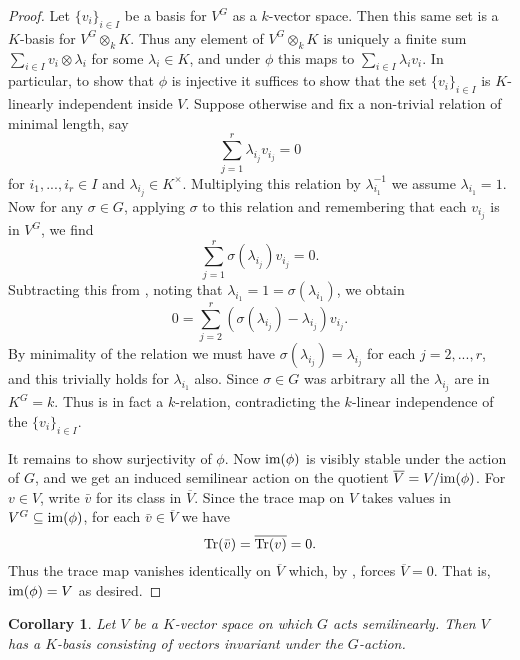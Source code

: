 \documentclass[11pt]{amsart}
\numberwithin{equation}{section}
\newtheorem{cor}[equation]{Corollary}
\theoremstyle{remark}
\theoremstyle{remark}
\theoremstyle{remark}
\theoremstyle{definition}
\theoremstyle{definition}
\theoremstyle{definition}
\theoremstyle{definition}
\theoremstyle{definition}
\theoremstyle{definition}
\begin{document}
\begin{proof}
 Let $\{v_i\}_{i\in I}$ be a basis for $V^G$ as a $k$-vector space. Then this same set is a $K$-basis for $V^G\otimes_k K$. Thus any element of $V^G\otimes_k K$ is uniquely a finite sum
$\sum_{i\in I}v_i\otimes \lambda_i$
for some $\lambda_i\in K$, and under $\phi$ this maps to $\sum_{i\in I}\lambda_i v_i$. In particular, to show that $\phi$ is injective it suffices to show that the set $\{v_i\}_{i\in I}$ is $K$-linearly independent inside $V$. Suppose otherwise and fix a non-trivial relation of minimal length, say
\begin{equation}\label{min relation}\sum_{j=1}^r\lambda_{i_j} v_{i_j}=0\end{equation}
for $i_1,...,i_r\in I$ and $\lambda_{i_j}\in K^\times$. Multiplying this relation by $\lambda_{i_1}^{-1}$ we  assume $\lambda_{i_1}=1$. Now for any $\sigma\in G$, applying $\sigma$ to this relation  and remembering that each $v_{i_j}$ is in $V^G$, we find
\[\sum_{j=1}^r\sigma(\lambda_{i_j})v_{i_j}=0.\]
Subtracting this from , noting that $\lambda_{i_1}=1=\sigma(\lambda_{i_1})$, we obtain 
\[0=\sum_{j=2}^{r}\left(\sigma(\lambda_{i_j})-\lambda_{i_j}\right)v_{i_j}.\]
By minimality of the relation  we must have $\sigma(\lambda_{i_j})=\lambda_{i_j}$ for each $j=2,...,r$, and this trivially holds for $\lambda_{i_1}$ also. Since $\sigma \in G$ was arbitrary all the $\lambda_{i_j}$ are in $K^G=k$. Thus  is in fact a $k$-relation, contradicting the $k$-linear independence of the $\{v_i\}_{i\in I}$. 

It remains to show surjectivity of $\phi$.  Now $\textup{im}(\phi)$ is visibly stable under the action of $G$, and we get an induced semilinear action on the quotient $\overline{V}=V/\textup{im}(\phi)$. For $v\in V$, write $\bar{v}$ for its class in $\overline{V}$. Since the trace map on $V$ takes values in $V^G\subseteq \textup{im}(\phi)$, for each $\bar{v}\in \overline{V}$ we have
\[\textup{Tr}(\bar{v})=\overline{\textup{Tr}(v)}=0.\]
Thus the trace map vanishes identically on $\overline{V}$ which, by , forces $\overline{V}=0$. That is, $\textup{im}(\phi)=V$ as desired.
\end{proof}

\begin{cor}
Let $V$ be a $K$-vector space on which $G$ acts semilinearly. Then $V$ has a $K$-basis consisting of vectors invariant under the $G$-action.
\end{cor}
\end{document}
